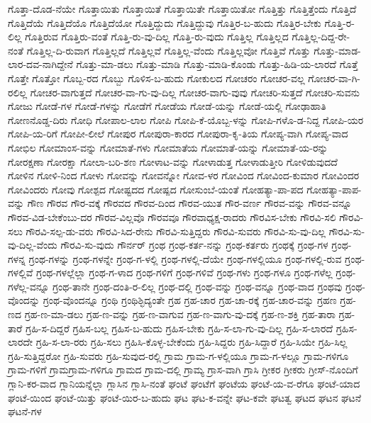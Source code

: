 ಗೊತ್ತಾ-ದೊಡ-ನೆಯೇ
ಗೊತ್ತಾಯಿತು
ಗೊತ್ತಾಯಿತೆ
ಗೊತ್ತಾಯಿತೇ
ಗೊತ್ತಾಯಿತೋ
ಗೊತ್ತಿತ್ತು
ಗೊತ್ತಿತ್ತೆಂದು
ಗೊತ್ತಿದೆ
ಗೊತ್ತಿದೆಯೆ
ಗೊತ್ತಿದೆಯೊ
ಗೊತ್ತಿದೆಯೋ
ಗೊತ್ತಿದ್ದುದು
ಗೊತ್ತಿದ್ದುವು
ಗೊತ್ತಿರ-ಬ-ಹುದು
ಗೊತ್ತಿರ-ಬೇಕು
ಗೊತ್ತಿ-ರ-ಲಿಲ್ಲ
ಗೊತ್ತಿರುವ
ಗೊತ್ತಿರು-ವಂತೆ
ಗೊತ್ತಿ-ರು-ವು-ದಿಲ್ಲ
ಗೊತ್ತಿ-ರು-ವುದು
ಗೊತ್ತಿಲ್ಲ
ಗೊತ್ತಿಲ್ಲದ
ಗೊತ್ತಿಲ್ಲ-ದಿದ್ದ-ರೇ-ನಂತೆ
ಗೊತ್ತಿಲ್ಲ-ದಿ-ರುವಾಗ
ಗೊತ್ತಿಲ್ಲದೆ
ಗೊತ್ತಿಲ್ಲವೆ
ಗೊತ್ತಿಲ್ಲ-ವೆಂದು
ಗೊತ್ತಿಲ್ಲವೋ
ಗೊತ್ತಿವೆ
ಗೊತ್ತು
ಗೊತ್ತು-ಮಾಡ-ಲಾರ-ದವ-ನಾಗಿದ್ದೇನೆ
ಗೊತ್ತು-ಮಾ-ಡಲು
ಗೊತ್ತು-ಮಾಡಿ
ಗೊತ್ತು-ಮಾಡಿ-ಕೊಂಡು
ಗೊತ್ತು-ಹಿಡಿ-ಯ-ಲಾರದೆ
ಗೊತ್ತೆ
ಗೊತ್ತೇ
ಗೊತ್ತೋ
ಗೊಬ್ಬ-ರದ
ಗೊಬ್ಬು
ಗೊಳಿಸ-ಬ-ಹುದು
ಗೋಕುಲದ
ಗೋಚರಂ
ಗೋಚರ-ವಲ್ಲ
ಗೋಚರ-ವಾ-ಗಿ-ರಲಿಲ್ಲ
ಗೋಚರ-ವಾಗುತ್ತದೆ
ಗೋಚರ-ವಾ-ಗು-ವು-ದಿಲ್ಲ
ಗೋಚರ-ವಾಗು-ವುವು
ಗೋಚರಿ-ಸುತ್ತದೆ
ಗೋಚರಿ-ಸುವನು
ಗೋಜು
ಗೋಡೆ-ಗಳ
ಗೋಡೆ-ಗಳನ್ನು
ಗೋಡೆಗೆ
ಗೋಡೆಯ
ಗೋಡೆ-ಯನ್ನು
ಗೋಡೆ-ಯಲ್ಲಿ
ಗೋಢಾಹಾತಿ
ಗೋಣನೊಡ್ಡ-ದಿರು
ಗೋಧಿ
ಗೋಪಾಲ-ಲಾಲ
ಗೋಪಿ
ಗೋಪಿ-ಕೆ-ಯೊಬ್ಬ-ಳನ್ನು
ಗೋಪಿ-ಗಳೊ-ಡ-ನಿದ್ದ
ಗೋಪಿ-ಯರ
ಗೋಪಿ-ಯ-ರಿಗೆ
ಗೋಪೀ-ಲೀಲೆ
ಗೋಪುರ
ಗೋಪುರಾ-ಕಾರದ
ಗೋಪುರಾ-ಕೃ-ತಿಯ
ಗೋಪ್ಯ-ವಾಗಿ
ಗೋಪ್ಯ-ವಾದ
ಗೋಭಿಲ
ಗೋಮಾಂಸ-ವನ್ನು
ಗೋಮಾತೆ-ಗಳು
ಗೋಮಾತೆಯ
ಗೋಮಾತೆ-ಯನ್ನು
ಗೋಮಾತೆ-ಯ-ರನ್ನು
ಗೋರಕ್ಷಣಾ
ಗೋರಕ್ಷಾ
ಗೋಲಾ-ಬರಿ-ಶಣ
ಗೋಳಾಟ-ವನ್ನು
ಗೋಳಾಡುತ್ತ
ಗೋಳಾಡುತ್ತೀರಿ
ಗೋಳಿಡುವುದದೆ
ಗೋಳಿನ
ಗೋಳಿ-ನಿಂದ
ಗೋಳು
ಗೋವನ್ನು
ಗೋವನ್ನೋ
ಗೋವ-ಳರ
ಗೋವಿಂದ
ಗೋವಿಂದ-ಕುಮಾರ
ಗೋವಿಂದರ
ಗೋವಿಂದರು
ಗೋವು
ಗೋಶ್ಪದ
ಗೋಷ್ಟದದ
ಗೋಷ್ಪದ
ಗೋಸುಂಬೆ-ಯಂತೆ
ಗೋಹತ್ಯಾ-ಪಾ-ಪದ
ಗೋಹತ್ಯಾ-ಪಾಪ-ವನ್ನು
ಗೌಣ
ಗೌರವ
ಗೌರ-ವಕ್ಕೆ
ಗೌರವದ
ಗೌರವ-ದಿಂದ
ಗೌರವ-ಯುತ
ಗೌರ-ವರ್ಣ
ಗೌರವ-ವನ್ನು
ಗೌರವ-ವನ್ನೂ
ಗೌರವ-ವಿಡ-ಬೇಕೆಂಬು-ದರ
ಗೌರವ-ವಿಲ್ಲವೊ
ಗೌರವವೂ
ಗೌರವಾಧ್ಯಕ್ಷ-ರಾದರು
ಗೌರವಿಸ-ಬೇಕು
ಗೌರವಿ-ಸಲಿ
ಗೌರವಿ-ಸಲು
ಗೌರವಿ-ಸಲ್ಪ-ಡು-ವರು
ಗೌರವಿ-ಸಿದ-ರೇನು
ಗೌರವಿ-ಸುತ್ತಿದ್ದರು
ಗೌರವಿ-ಸುವರು
ಗೌರವಿ-ಸು-ವು-ದಿಲ್ಲ
ಗೌರವಿ-ಸು-ವು-ದಿಲ್ಲ-ವೆಂದು
ಗೌರವಿ-ಸು-ವುದು
ಗೌರ್ನರ್
ಗ್ರಂಥ
ಗ್ರಂಥ-ಕರ್ತ-ನನ್ನು
ಗ್ರಂಥ-ಕರ್ತರು
ಗ್ರಂಥಕ್ಕೆ
ಗ್ರಂಥ-ಗಳ
ಗ್ರಂಥ-ಗಳನ್ನ
ಗ್ರಂಥ-ಗಳನ್ನು
ಗ್ರಂಥ-ಗಳನ್ನೇ
ಗ್ರಂಥ-ಗ-ಳಲ್ಲಿ
ಗ್ರಂಥ-ಗಳಲ್ಲಿ-ದೆಯೇ
ಗ್ರಂಥ-ಗಳಲ್ಲಿಯೂ
ಗ್ರಂಥ-ಗಳಲ್ಲಿ-ರುವ
ಗ್ರಂಥ-ಗಳಲ್ಲಿವೆ
ಗ್ರಂಥ-ಗಳಲ್ಲೆಲ್ಲಾ
ಗ್ರಂಥ-ಗ-ಳಾದ
ಗ್ರಂಥ-ಗಳಿಗೆ
ಗ್ರಂಥ-ಗಳಿವೆ
ಗ್ರಂಥ-ಗಳು
ಗ್ರಂಥ-ಗಳೂ
ಗ್ರಂಥ-ಗಳೆಲ್ಲ
ಗ್ರಂಥ-ಗಳೆಲ್ಲ-ವನ್ನೂ
ಗ್ರಂಥ-ತಾನೇ
ಗ್ರಂಥ-ದಂತಿ-ರ-ಲಿಲ್ಲ
ಗ್ರಂಥ-ದಲ್ಲಿ
ಗ್ರಂಥ-ವನ್ನು
ಗ್ರಂಥ-ವನ್ನೂ
ಗ್ರಂಥ-ವಾದ
ಗ್ರಂಥವು
ಗ್ರಂಥ-ವೊಂದನ್ನು
ಗ್ರಂಥ-ವೊಂದನ್ನೂ
ಗ್ರಂಥಿ
ಗ್ರಂಥಿಶ್ಛಿದ್ಯಂತೇ
ಗ್ರಹ
ಗ್ರಹ-ಚಾರ
ಗ್ರಹ-ಚಾ-ರಕ್ಕೆ
ಗ್ರಹ-ಚಾರ-ವನ್ನು
ಗ್ರಹಣ
ಗ್ರಹ-ಣದ
ಗ್ರಹ-ಣ-ಮಾ-ಡಲು
ಗ್ರಹ-ಣ-ವನ್ನು
ಗ್ರಹ-ಣ-ವಾಗುವ
ಗ್ರಹ-ಣ-ವಾಗು-ವು-ದಕ್ಕೆ
ಗ್ರಹ-ಣ-ಶಕ್ತಿ
ಗ್ರಹ-ತಾರಾ
ಗ್ರಹ-ತಾರೆ
ಗ್ರಹಿ-ಸ-ದಿದ್ದರೆ
ಗ್ರಹಿಸ-ಬಲ್ಲ
ಗ್ರಹಿಸ-ಬ-ಹುದು
ಗ್ರಹಿಸ-ಬೇಕು
ಗ್ರಹಿ-ಸ-ಲಾ-ಗು-ವು-ದಿಲ್ಲ
ಗ್ರಹಿ-ಸ-ಲಾರದೆ
ಗ್ರಹಿಸ-ಲಾರದೇ
ಗ್ರಹಿ-ಸ-ಲಾ-ರರು
ಗ್ರಹಿ-ಸಲು
ಗ್ರಹಿಸಿ-ಕೊಳ್ಳ-ಬೇಕೆಂದು
ಗ್ರಹಿ-ಸಿದ್ದರು
ಗ್ರಹಿ-ಸಿದ್ದಾರೆ
ಗ್ರಹಿ-ಸಿಯೇ
ಗ್ರಹಿ-ಸಿಲ್ಲ
ಗ್ರಹಿ-ಸುತ್ತಿದ್ದರೋ
ಗ್ರಹಿ-ಸುವರು
ಗ್ರಹಿ-ಸುವುದ-ರಲ್ಲಿ
ಗ್ರಾಮ
ಗ್ರಾಮ-ಗ-ಳಲ್ಲಿಯೂ
ಗ್ರಾಮ-ಗ-ಳಲ್ಲೂ
ಗ್ರಾಮ-ಗಳಿಗೂ
ಗ್ರಾಮ-ಗಳಿಗೆ
ಗ್ರಾಮಗ್ರಾಮ-ಗಳಿಗೂ
ಗ್ರಾಮದ
ಗ್ರಾಮ-ದಲ್ಲಿ
ಗ್ರಾಮ್ಯ
ಗ್ರಾಸ-ವಾಗಿ
ಗ್ರಾಸಿ
ಗ್ರೀಕರ
ಗ್ರೀಕರು
ಗ್ರೀಸ್‌-ನೊಂದಿಗೆ
ಗ್ಲಾನಿ-ಕರ-ವಾದ
ಗ್ಲಾನಿಯನ್ನೆಲ್ಲಾ
ಗ್ಲಾಸಿನ
ಗ್ಲಾಸಿ-ನಂತೆ
ಘಂಟೆ
ಘಂಟೆಗೆ
ಘಂಟೆಯ
ಘಂಟೆ-ಯ-ವ-ರೆಗೂ
ಘಂಟೆ-ಯಾದ
ಘಂಟೆ-ಯಿಂದ
ಘಂಟೆ-ಯಿತ್ತು
ಘಂಟೆ-ಯಿರ-ಬ-ಹುದು
ಘಟ
ಘಟ-ಕ-ವನ್ನೇ
ಘಟ-ಕವೇ
ಘಟತ್ವ
ಘಟದ
ಘಟನ
ಘಟನೆ
ಘಟನೆ-ಗಳ
